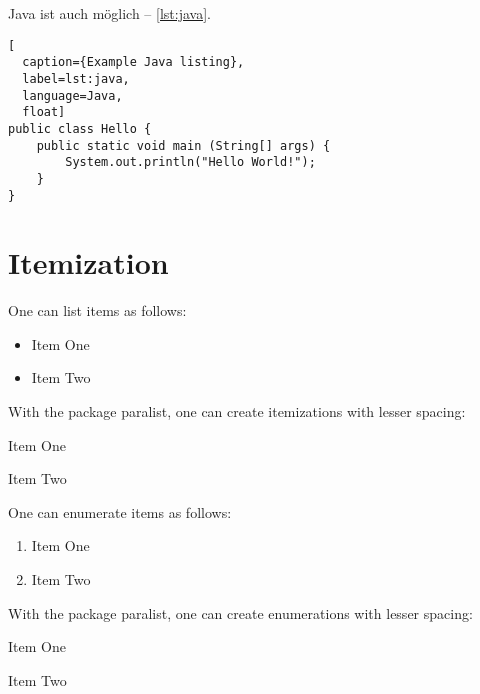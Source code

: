 \documentclass[
  numbers=autoendperiod,
  ngerman,  %
  a4paper,  %
  twoside,  %
  bibliography=totoc,
  headsepline,
  cleardoublepage=empty,
  parskip=half,
  draft=false
]{scrbook}
\theoremstyle{break}
\begin{document}
Java ist auch möglich -- \cref{lst:java}.

\begin{ltgexample}
\begin{lstlisting}[
  caption={Example Java listing},
  label=lst:java,
  language=Java,
  float]
public class Hello {
    public static void main (String[] args) {
        System.out.println("Hello World!");
    }
}
\end{lstlisting}
\end{ltgexample}

\section{Itemization}

One can list items as follows:

\begin{ltgexample}
\begin{itemize}
  \item Item One
  \item Item Two
\end{itemize}
\end{ltgexample}

With the package paralist, one can create itemizations with lesser spacing:

\begin{ltgexample}
\begin{compactitem}
  \item Item One
  \item Item Two
\end{compactitem}
\end{ltgexample}

One can enumerate items as follows:

\begin{ltgexample}
\begin{enumerate}
  \item Item One
  \item Item Two
\end{enumerate}
\end{ltgexample}

With the package paralist, one can create enumerations with lesser spacing:

\begin{ltgexample}
\begin{compactenum}
  \item Item One
  \item Item Two
\end{compactenum}
\end{ltgexample}
\end{document}
